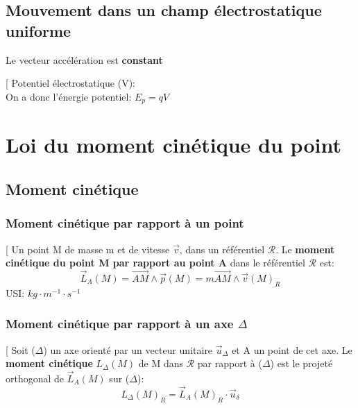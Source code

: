 \documentclass[12pt,hidelinks]{article}
\begin{document}
    \subsection{Mouvement dans un champ électrostatique uniforme}
        Le vecteur accélération est \textbf{constant}
        \begin{DashedDefinition}{}[
            Potentiel électrostatique (V):  \\
            On a donc l'énergie potentiel: $E_p = qV$
        \end{DashedDefinition}
\newpage
\section{Loi du moment cinétique du point}
\vspace{3cm}

    \subsection{Moment cinétique}
        \subsubsection{Moment cinétique par rapport à un point}
        \begin{DashedDefinition}{}[
            Un point M de masse m et de vitesse $\vec v$, dans un référentiel $\mathcal{R}$. Le \textbf{moment cinétique du point M par rapport au point A} dans le référentiel $\mathcal{R}$ est:
            \[\vec L_A(M)=\overrightarrow{AM} \wedge \vec p (M) = m \overrightarrow{AM} \wedge \vec v (M)_R\]
            USI: $kg \cdot m^{-1} \cdot s^{-1}$
        \end{DashedDefinition}

        \subsubsection{Moment cinétique par rapport à un axe $\Delta$}
        \begin{DashedDefinition}{}[
            Soit ($\Delta$) un axe orienté par un vecteur unitaire $\vec u_\Delta$ et A un point de cet axe. Le \textbf{moment cinétique} $L_\Delta(M)$ de M dans $\mathcal{R}$ par rapport à ($\Delta$) est le projeté orthogonal de $\vec L_A(M)$ sur ($\Delta$):
            \[L_\Delta(M)_R = \vec L_A(M)_R \cdot \vec u_\delta\]
        \end{DashedDefinition}
        
\end{document}
